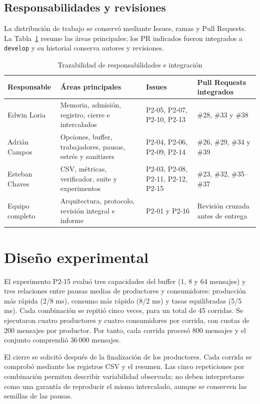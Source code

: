 \documentclass[conference]{IEEEtran}
\begin{document}
\subsection{Responsabilidades y revisiones}
La distribución de trabajo se conservó mediante Issues, ramas y Pull Requests. La Tabla~\ref{tab:responsables} resume las áreas principales; los PR indicados fueron integrados a \texttt{develop} y su historial conserva autores y revisiones.

\begin{table}[htbp]
\caption{Trazabilidad de responsabilidades e integración}\label{tab:responsables}
\centering\footnotesize
\setlength{\tabcolsep}{3pt}
\begin{tabular}{p{}p{}p{}p{}}
\toprule
Responsable & Áreas principales & Issues & Pull Requests integrados \\
\midrule
Edwin Loria & Memoria, admisión, registro, cierre e intercalados & P2-05, P2-07, P2-10, P2-13 & \#28, \#33 y \#38 \\
Adrián Campos & Opciones, buffer, trabajadores, pausas, estrés y sanitizers & P2-04, P2-06, P2-09, P2-14 & \#26, \#29, \#34 y \#39 \\
Esteban Chaves & CSV, métricas, verificador, suite y experimentos & P2-03, P2-08, P2-11, P2-12, P2-15 & \#23, \#32, \#35--\#37 \\
Equipo completo & Arquitectura, protocolo, revisión integral e informe & P2-01 y P2-16 & Revisión cruzada antes de entrega \\
\bottomrule
\end{tabular}
\end{table}

\section{Diseño experimental}
El experimento P2-15 evaluó tres capacidades del buffer (1, 8 y 64 mensajes) y tres relaciones entre pausas medias de productores y consumidores: producción más rápida (2/8 ms), consumo más rápido (8/2 ms) y tasas equilibradas (5/5 ms). Cada combinación se repitió cinco veces, para un total de 45 corridas. Se ejecutaron cuatro productores y cuatro consumidores por corrida, con cuotas de 200 mensajes por productor. Por tanto, cada corrida procesó 800 mensajes y el conjunto comprendió 36\,000 mensajes.

El cierre se solicitó después de la finalización de los productores. Cada corrida se comprobó mediante los registros CSV y el resumen. Las cinco repeticiones por combinación permiten describir variabilidad observada; no deben interpretarse como una garantía de reproducir el mismo intercalado, aunque se conserven las semillas de las pausas.
\end{document}

